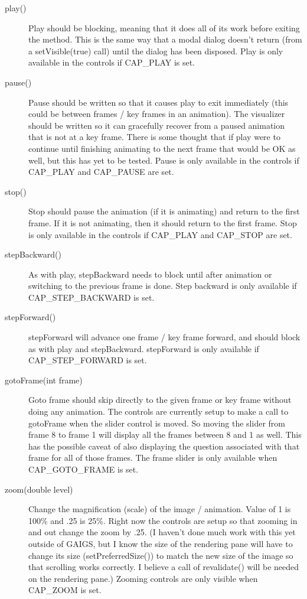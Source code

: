 \documentclass[11pt,letterpaper]{book}
\begin{document}
\begin{description}


\item[play()] Play should be blocking, meaning that it does all of its
  work before exiting the method. This is the same way that a modal
  dialog doesn’t return (from a setVisible(true) call) until the
  dialog has been disposed.  Play is only available in the controls if
  CAP\_PLAY is set.




\item[pause()] Pause should be written so that it causes play to exit
  immediately (this could be between frames / key frames in an
  animation). The visualizer should be written so it can gracefully
  recover from a paused animation that is not at a key frame. There is
  some thought that if play were to continue until finishing animating
  to the next frame that would be OK as well, but this has yet to be
  tested.  Pause is only available in the controls if CAP\_PLAY and
  CAP\_PAUSE are set.


\item[stop()] Stop should pause the animation (if it is animating) and
  return to the first frame. If it is not animating, then it should
  return to the first frame.  Stop is only available in the
  controls if CAP\_PLAY and CAP\_STOP are set.


\item[stepBackward()] As with play, stepBackward needs to block until
  after animation or switching to the previous frame is done.  Step
  backward is only available if CAP\_STEP\_BACKWARD is set.


\item[stepForward()] stepForward will advance one frame / key frame
  forward, and should block as with play and stepBackward. stepForward
  is only available if CAP\_STEP\_FORWARD is set.


\item[gotoFrame(int frame)] Goto frame should skip directly to the
  given frame or key frame without doing any animation. The controls
  are currently setup to make a call to gotoFrame when the slider
  control is moved. So moving the slider from frame 8 to frame 1 will
  display all the frames between 8 and 1 as well. This has the
  possible caveat of also displaying the question associated with that
  frame for all of those frames.  The frame slider is only available
  when CAP\_GOTO\_FRAME is set.


\item[zoom(double level)] Change the magnification (scale) of the
  image / animation. Value of 1 is 100\% and .25 is 25\%. Right now
  the controls are setup so that zooming in and out change the zoom by
  .25.  (I haven’t done much work with this yet outside of GAIGS, but I know the size of
  the rendering pane will have to change its size
  (setPreferredSize()) to match the new size of the image so that
  scrolling works correctly. I believe a call of revalidate() will be
  needed on the rendering pane.)  Zooming controls are only visible
  when CAP\_ZOOM is set.



\end{description}
\end{document}
